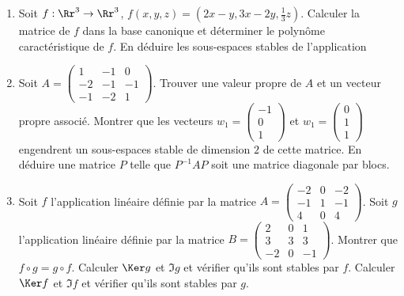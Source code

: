 \documentclass[12pt, class=report,crop=false]{standalone}
\begin{document}
 
\begin{miniexercices}
\sauteligne
\begin{enumerate}

  \item Soit $f : \Rr^3 \to \Rr^3$,
  $f(x,y,z) = (2x-y,3x-2y,\frac13z)$. Calculer la matrice de $f$ dans la base canonique et déterminer le polynôme caractéristique de $f$. En déduire les sous-espaces stables de l'application 
    
  \item Soit  $A = 
  \left(\begin{smallmatrix}
1 & -1 & 0 \\
-2 & -1 & -1 \\
-1 & -2 & 1  
  \end{smallmatrix}\right)$.
  Trouver une valeur propre de $A$ et un vecteur propre associé.   
  Montrer que les vecteurs 
  $w_1 = \left(\begin{smallmatrix}-1\\0\\1\end{smallmatrix}\right)$ et $w_1 = \left(\begin{smallmatrix}0\\1\\1\end{smallmatrix}\right)$ engendrent un sous-espaces stable de dimension $2$ de cette matrice. En déduire une matrice $P$ telle que $P^{-1}AP$ soit une matrice diagonale par blocs.
  
  \item Soit $f$ l'application linéaire définie
  par la matrice 
  $A = 
  \left(\begin{smallmatrix}
-2 & 0 & -2 \\
-1 & 1 & -1 \\
4 & 0 & 4
\end{smallmatrix}\right)$.
Soit $g$ l'application linéaire définie
  par la matrice 
  $B = 
  \left(\begin{smallmatrix}
2 & 0 & 1 \\
3 & 3 & 3 \\
-2 & 0 & -1
\end{smallmatrix}\right)$.
  Montrer que $f \circ g = g \circ f$. Calculer $\Ker g$ et $\Im g$ et vérifier qu'ils sont stables par $f$. Calculer $\Ker f$ et $\Im f$ et vérifier qu'ils sont stables par $g$.
  
\end{enumerate}
\end{miniexercices}
\end{document}
